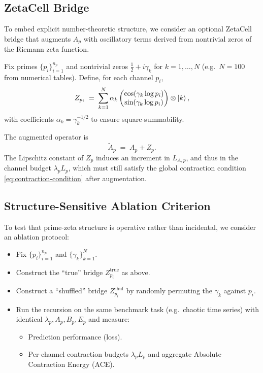 \documentclass[11pt]{article}
\begin{document}
\subsection{ZetaCell Bridge}

To embed explicit number-theoretic structure, we consider an optional ZetaCell bridge that augments $A_p$ with oscillatory terms derived from nontrivial zeros of the Riemann zeta function.

Fix primes $\{p_i\}_{i=1}^{n_p}$ and nontrivial zeros $\frac{1}{2} + i\gamma_k$ for $k = 1,\dots,N$ (e.g.\ $N=100$ from numerical tables).
Define, for each channel $p_i$,
\begin{equation}
  Z_{p_i} \;=\;
  \sum_{k=1}^N \alpha_k
  \begin{pmatrix}
    \cos(\gamma_k \log p_i) \\
    \sin(\gamma_k \log p_i)
  \end{pmatrix}
  \otimes \ket{k},
\end{equation}
with coefficients $\alpha_k = \gamma_k^{-1/2}$ to ensure square-summability.

The augmented operator is
\begin{equation}
  \tilde{A}_p \;=\; A_p + Z_p.
\end{equation}
The Lipschitz constant of $Z_p$ induces an increment in $L_{A,p}$, and thus in the channel budget $\lambda_p L_p$, which must still satisfy the global contraction condition \eqref{eq:contraction-condition} after augmentation.

\subsection{Structure-Sensitive Ablation Criterion}

To test that prime-zeta structure is operative rather than incidental, we consider an ablation protocol:

\begin{itemize}[leftmargin=1.5em]
  \item Fix $\{p_i\}_{i=1}^{n_p}$ and $\{\gamma_k\}_{k=1}^{N}$.
  \item Construct the ``true'' bridge $Z^{\text{true}}_{p_i}$ as above.
  \item Construct a ``shuffled'' bridge $Z^{\text{shuf}}_{p_i}$ by randomly permuting the $\gamma_k$ against $p_i$.
  \item Run the recursion on the same benchmark task (e.g.\ chaotic time series) with identical $\lambda_p, A_p, B_p, E_p$ and measure:
    \begin{itemize}
      \item Prediction performance (loss).
      \item Per-channel contraction budgets $\lambda_p L_p$ and aggregate Absolute Contraction Energy (ACE).
    \end{itemize}
\end{itemize}
\end{document}

